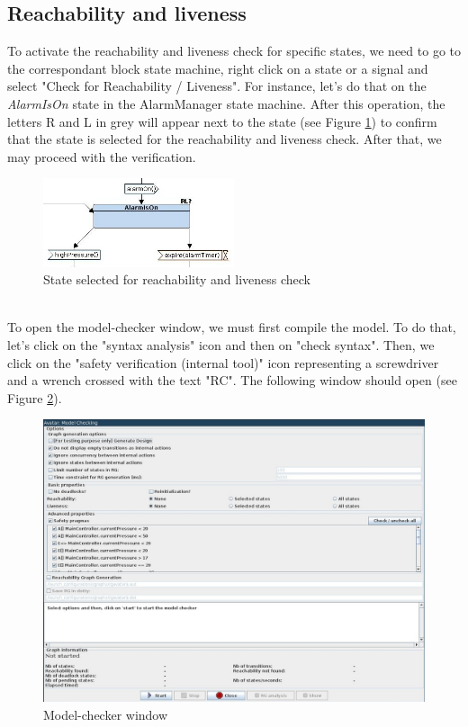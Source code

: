 \documentclass[12pt]{article}
\begin{document}
\subsection{Reachability and liveness}
To activate the reachability and liveness check for specific states, we need to go to the correspondant block state machine, right click on a state or a signal and select "Check for Reachability / Liveness". For instance, let's do that on the \textit{AlarmIsOn} state in the AlarmManager state machine. After this operation, the letters R and L in grey will appear next to the state (see Figure \ref{fig:rl_grey}) to confirm that the state is selected for the reachability and liveness check. After that, we may proceed with the verification.
\begin{figure}[h!]
\centering
\includegraphics[width=0.5\textwidth]{images/rl_grey.jpg}
\caption{State selected for reachability and liveness check}
\label{fig:rl_grey}
\end{figure}
\\To open the model-checker window, we must first compile the model. To do that, let's click on the "syntax analysis" icon and then on "check syntax". Then, we click on the "safety verification (internal tool)" icon representing a screwdriver and a wrench crossed with the text "RC". The following window should open (see Figure \ref{fig:mcwindow}).
\begin{figure}[h!]
\centering
\includegraphics[width=\textwidth]{images/modelcheckerwindow.jpg}
\caption{Model-checker window}
\label{fig:mcwindow}
\end{figure}
\end{document}
